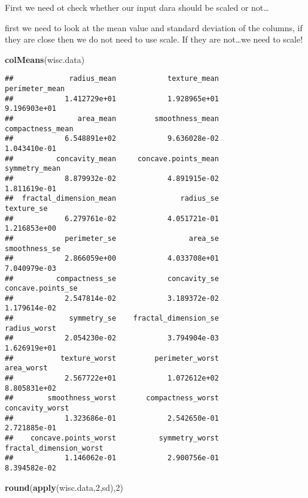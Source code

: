 \documentclass[
]{article}
\newenvironment{Shaded}{\begin{snugshade}}{\end{snugshade}}
\newcommand{\DecValTok}[1]{\textcolor[rgb]{0.00,0.00,0.81}{#1}}
\newcommand{\KeywordTok}[1]{\textcolor[rgb]{0.13,0.29,0.53}{\textbf{#1}}}
\newcommand{\NormalTok}[1]{#1}
\begin{document}
First we need ot check whether our input dara should be scaled or
not\ldots{}

first we need to look at the mean value and standard deviation of the
columns, if they are close then we do not need to use scale. If they are
not\ldots we need to scale!

\begin{Shaded}
\begin{Highlighting}[]
\KeywordTok{colMeans}\NormalTok{(wisc.data)}
\end{Highlighting}
\end{Shaded}

\begin{verbatim}
##             radius_mean            texture_mean          perimeter_mean 
##            1.412729e+01            1.928965e+01            9.196903e+01 
##               area_mean         smoothness_mean        compactness_mean 
##            6.548891e+02            9.636028e-02            1.043410e-01 
##          concavity_mean     concave.points_mean           symmetry_mean 
##            8.879932e-02            4.891915e-02            1.811619e-01 
##  fractal_dimension_mean               radius_se              texture_se 
##            6.279761e-02            4.051721e-01            1.216853e+00 
##            perimeter_se                 area_se           smoothness_se 
##            2.866059e+00            4.033708e+01            7.040979e-03 
##          compactness_se            concavity_se       concave.points_se 
##            2.547814e-02            3.189372e-02            1.179614e-02 
##             symmetry_se    fractal_dimension_se            radius_worst 
##            2.054230e-02            3.794904e-03            1.626919e+01 
##           texture_worst         perimeter_worst              area_worst 
##            2.567722e+01            1.072612e+02            8.805831e+02 
##        smoothness_worst       compactness_worst         concavity_worst 
##            1.323686e-01            2.542650e-01            2.721885e-01 
##    concave.points_worst          symmetry_worst fractal_dimension_worst 
##            1.146062e-01            2.900756e-01            8.394582e-02
\end{verbatim}

\begin{Shaded}
\begin{Highlighting}[]
\KeywordTok{round}\NormalTok{(}\KeywordTok{apply}\NormalTok{(wisc.data,}\DecValTok{2}\NormalTok{,sd),}\DecValTok{2}\NormalTok{)}
\end{Highlighting}
\end{Shaded}
\end{document}
